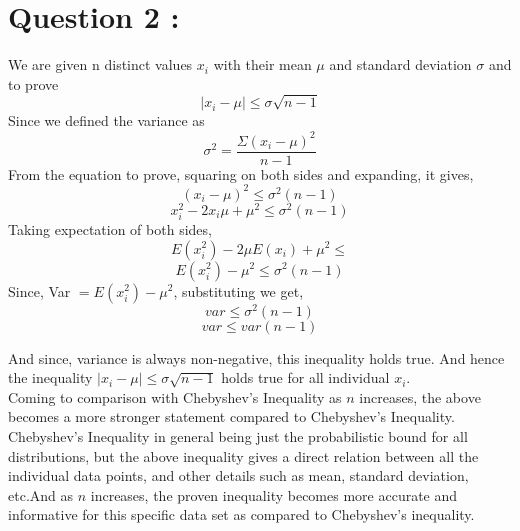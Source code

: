 \documentclass[11pt,a4paper,titlepage]{article}
\begin{document}
{\section{Question 2 : }{
We are given n distinct values $x_i$ with their mean $\mu$ and standard deviation $\sigma$ and to prove 
$$|x_i-\mu| \leq \sigma \sqrt{n-1}$$
Since we defined the variance as 
$$\sigma^2 = \frac{\Sigma(x_i - \mu)^2}{n-1}$$
From the equation to prove, squaring on both sides and expanding, it gives,
$$(x_i - \mu)^2 \leq \sigma^2(n-1) $$
$$x_i^2 -2x_i\mu + \mu^2 \leq \sigma^2(n-1)$$
Taking expectation of both sides,
$$E(x_i^2) - 2\mu E(x_i) + \mu^2 \leq $$
$$E(x_i^2) - \mu^2 \leq \sigma^2(n-1)$$
Since, Var $ = E(x_i^2) - \mu^2$, substituting we get,
$${var} \leq \sigma^2(n-1)$$
$${var} \leq {var}(n-1)$$

And since, variance is always non-negative, this inequality holds true. And hence the inequality $|x_i-\mu| \leq \sigma \sqrt{n-1}$ holds true for all individual $x_i$. \\

Coming to comparison with Chebyshev's Inequality as $n$ increases, the above becomes a more stronger statement compared to Chebyshev's Inequality. Chebyshev's Inequality in general being just the probabilistic bound for all distributions, but the above inequality gives a direct relation between all the individual data points, and other details such as mean, standard deviation, etc.And as $n$ increases, the proven inequality becomes more accurate and informative for this specific data set as compared to Chebyshev's inequality.
}
\newpage
}
\end{document}
